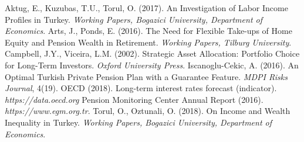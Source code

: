 \documentclass[]{elsarticle}
\begin{document}
\begin{thebibliography}{}
 Aktug, E., Kuzubas, T.U., Torul, O. (2017). An Investigation of Labor Income Profiles in Turkey. \textit{Working Papers, Bogazici University, Department of Economics}.
 Arts, J., Ponds, E. (2016). The Need for Flexible Take-ups of Home Equity and Pension Wealth in Retirement. \textit{Working Papers, Tilburg University}.
 Campbell, J.Y., Viceira, L.M. (2002). Strategic Asset Allocation: Portfolio Choice for Long-Term Investors. \textit{Oxford University Press}.
 Iscanoglu-Cekic, A. (2016). An Optimal Turkish Private Pension Plan with a Guarantee Feature. \textit{MDPI Risks Journal}, 4(19).
 OECD (2018). Long-term interest rates forecast (indicator). \textit{https://data.oecd.org}
 Pension Monitoring Center Annual Report (2016). \textit{https://www.egm.org.tr}.
 Torul, O., Oztunali, O. (2018). On Income and Wealth Inequality in Turkey. \textit{Working Papers, Bogazici University, Department of Economics}.
\end{thebibliography}
\end{document}
